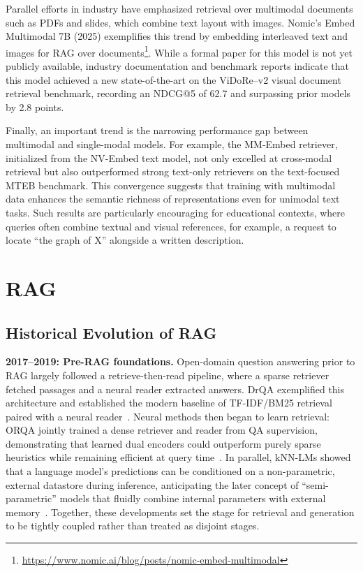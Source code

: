 Parallel efforts in industry have emphasized retrieval over multimodal documents such as PDFs and slides, which combine text layout with images. Nomic's Embed Multimodal 7B (2025) exemplifies this trend by embedding interleaved text and images for RAG over documents\footnote{\url{https://www.nomic.ai/blog/posts/nomic-embed-multimodal}}. While a formal paper for this model is not yet publicly available, industry documentation and benchmark reports indicate that this model achieved a new state-of-the-art on the ViDoRe–v2 visual document retrieval benchmark, recording an NDCG@5 of 62.7 and surpassing prior models by 2.8 points.

Finally, an important trend is the narrowing performance gap between multimodal and single-modal models. For example, the MM-Embed retriever, initialized from the NV-Embed text model, not only excelled at cross-modal retrieval but also outperformed strong text-only retrievers on the text-focused MTEB benchmark. This convergence suggests that training with multimodal data enhances the semantic richness of representations even for unimodal text tasks. Such results are particularly encouraging for educational contexts, where queries often combine textual and visual references, for example, a request to locate “the graph of X” alongside a written description.


\section{RAG}

\subsection{Historical Evolution of RAG}

\textbf{2017--2019: Pre-RAG foundations.}
Open-domain question answering prior to RAG largely followed a retrieve-then-read pipeline, where a sparse retriever fetched passages and a neural reader extracted answers. DrQA exemplified this architecture and established the modern baseline of TF-IDF/BM25 retrieval paired with a neural reader~\cite{chen2017drqa}. Neural methods then began to learn retrieval: ORQA jointly trained a dense retriever and reader from QA supervision, demonstrating that learned dual encoders could outperform purely sparse heuristics while remaining efficient at query time~\cite{orqa2019}. In parallel, kNN-LMs showed that a language model’s predictions can be conditioned on a non-parametric, external datastore during inference, anticipating the later concept of ``semi-parametric'' models that fluidly combine internal parameters with external memory~\cite{khandelwal2020knnlm}. Together, these developments set the stage for retrieval and generation to be tightly coupled rather than treated as disjoint stages.

